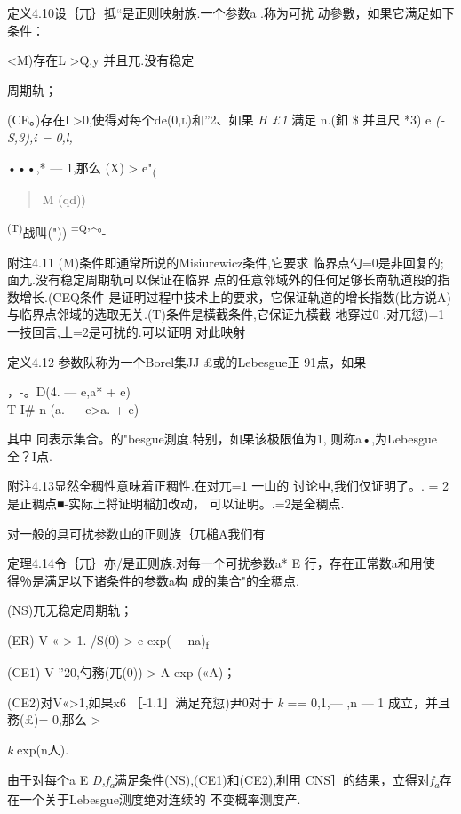\documentclass{article}
\begin{document}
定义4.10设｛兀｝抵``是正则映射族.一个参数a .称为可扰
动參數，如果它满足如下条件：

\textless{}M)存在L \textgreater{}Q,y 并且兀.没有稳定

周期轨；

(CE。)存在l \textgreater{}0,使得对每个de\textsc{(0,l)}和''2、如果
\emph{H £1} 满足 n.(釦 \$ 并且尺 *3) e \emph{(-S,3),i = 0,l,}

•••,* --- 1,那么 (X)\textbar{} \textgreater{} e"\textsubscript{(}

\begin{quote}
M (qd))
\end{quote}

\textsuperscript{(T)}战叫(")) \textsuperscript{=Q}'\^{}°-

附注4.11 (M)条件即通常所说的Misiurewicz条件,它要求
临界点勺=0是非回复的;面九.没有稳定周期轨可以保证在临界
点的任意邻域外的任何足够长南轨道段的指数增长.(CEQ条件
是证明过程中技术上的要求，它保证轨道的增长指数(比方说A)
与临界点邻域的选取无关.(T)条件是橫截条件,它保证九橫截 地穿过0 .对兀愆)=1
一技回言,丄=2是可扰的.可以证明 对此映射

定义4.12 参数队称为一个Borel集JJ £或的Lebesgue正 91点，如果

，-{\textbar{}。D(4. --- e,a* + e) \textbar{}\\
}T I\# n (a. --- e\textgreater{}a. + e) \textbar{}

其中 冋表示集合。的"besgue測度.特别，如果该极限值为1,
则称a•,为Lebesgue全？I点.

附注4.13显然全稠性意味着正稠性.在对兀=1 一山的 讨论中,我们仅证明了。. =
2是正稠点■-实际上将证明稲加改动， 可以证明。.=2是全稠点.

对一般的具可扰参数山的正则族｛兀槌A我们有

定理4.14令｛兀｝亦/是正则族.对每一个可扰参数a* E
行，存在正常数a和用使得％是满足以下诸条件的参数a构 成的集合"的全稠点.

(NS)兀无稳定周期轨；

(ER) V « \textgreater{} 1. \textbar{}/S(0) \textbar{} \textgreater{} e
exp(--- na)\textsubscript{f}

(CE1) V ''20,\textbar{}勺務(兀(0))\textbar{} \textgreater{} A exp («A)；

(CE2)对V«\textgreater{}1,如果x6 ［-1.1］满足充愆)尹0对于 \emph{k} ==
0,1,--- ,n --- 1 成立，并且務(£)= 0,那么 \textbar{} \textgreater{}

\emph{k} exp(n人).

由于对每个a E \emph{D,f\textsubscript{a}}满足条件(NS),(CE1)和(CE2),利用
CNS］的结果，立得对\emph{f\textsubscript{a}}存在一个关于Lebesgue测度绝对连续的
不变概率测度产.
\end{document}

